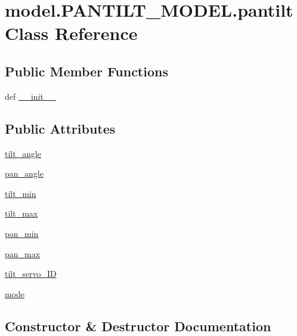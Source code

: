 \hypertarget{classmodel_1_1PANTILT__MODEL_1_1pantilt}{}\section{model.\+P\+A\+N\+T\+I\+L\+T\+\_\+\+M\+O\+D\+E\+L.\+pantilt Class Reference}
\label{classmodel_1_1PANTILT__MODEL_1_1pantilt}
\subsection*{Public Member Functions}
\begin{DoxyCompactItemize}
\item 
def \hyperlink{classmodel_1_1PANTILT__MODEL_1_1pantilt_a427ce8d85390b98a65fba754b394f37a}{\+\_\+\+\_\+init\+\_\+\+\_\+}
\end{DoxyCompactItemize}
\subsection*{Public Attributes}
\begin{DoxyCompactItemize}
\item 
\hyperlink{classmodel_1_1PANTILT__MODEL_1_1pantilt_a7833827d59e9bd6212b147b90ba923e7}{tilt\+\_\+angle}
\item 
\hyperlink{classmodel_1_1PANTILT__MODEL_1_1pantilt_a3c9ae4ae2bfb981b9258752f8baf9878}{pan\+\_\+angle}
\item 
\hyperlink{classmodel_1_1PANTILT__MODEL_1_1pantilt_abed248a0b87a8f060c65e185125cea09}{tilt\+\_\+min}
\item 
\hyperlink{classmodel_1_1PANTILT__MODEL_1_1pantilt_a774886c6a767076f047395c605e1262f}{tilt\+\_\+max}
\item 
\hyperlink{classmodel_1_1PANTILT__MODEL_1_1pantilt_adf70a2a96aab83f9a9557c0aae51bfbb}{pan\+\_\+min}
\item 
\hyperlink{classmodel_1_1PANTILT__MODEL_1_1pantilt_a1ba69acbc76ac90737dd509da61762be}{pan\+\_\+max}
\item 
\hyperlink{classmodel_1_1PANTILT__MODEL_1_1pantilt_ab0d3687530a05750330e616d8cd902b9}{tilt\+\_\+servo\+\_\+\+I\+D}
\item 
\hyperlink{classmodel_1_1PANTILT__MODEL_1_1pantilt_a3516dc36ca1b80a3fcd01f8a88cd4974}{mode}
\end{DoxyCompactItemize}


\subsection{Constructor \& Destructor Documentation}
\hypertarget{classmodel_1_1PANTILT__MODEL_1_1pantilt_a427ce8d85390b98a65fba754b394f37a}{}
